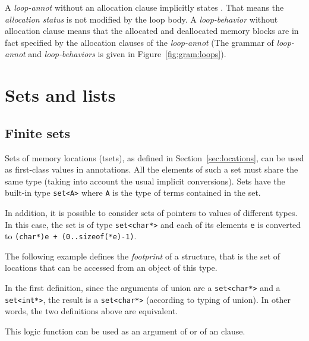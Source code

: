 A {\sl loop-annot} without an allocation clause implicitly states \Loop \allocates \nothing.
That means the {\sl allocation status} is not modified by the loop body.
A {\sl loop-behavior} without allocation clause means that
the allocated and deallocated memory blocks are in fact specified by the allocation clauses
of the {\sl loop-annot}
(The grammar of {\sl loop-annot} and {\sl loop-behaviors} is given in Figure~\ref{fig:gram:loops}).

\section{Sets and lists}


\subsection{Finite sets}\label{sec:sets}
Sets of memory locations (tsets), as defined in Section~\ref{sec:locations},
can be used as first-class values in
annotations. All the elements of such a set must share the same type
(taking into account the usual implicit conversions).
Sets have the built-in type \lstinline|set<A>|
where \lstinline|A| is the type of terms contained in the set.

In addition, it is possible to consider sets of pointers to values of
different types. In this case, the set is of type
\lstinline|set<char*>| and
each of its elements \lstinline|e| is converted to
\lstinline|(char*)e + (0..sizeof(*e)-1)|.

\begin{example}
  The following example defines the \emph{footprint} of a
  structure, that is the set of locations that can be accessed from an
  object of this type.


  In the first definition, since the arguments of union are a
  \lstinline|set<char*>| and a \lstinline|set<int*>|,
  the result is a \lstinline|set<char*>| (according to typing of union). In
  other words, the two definitions above are equivalent.

  This logic function can be used as an argument of \separated or of an
  \assigns clause.
\end{example}

